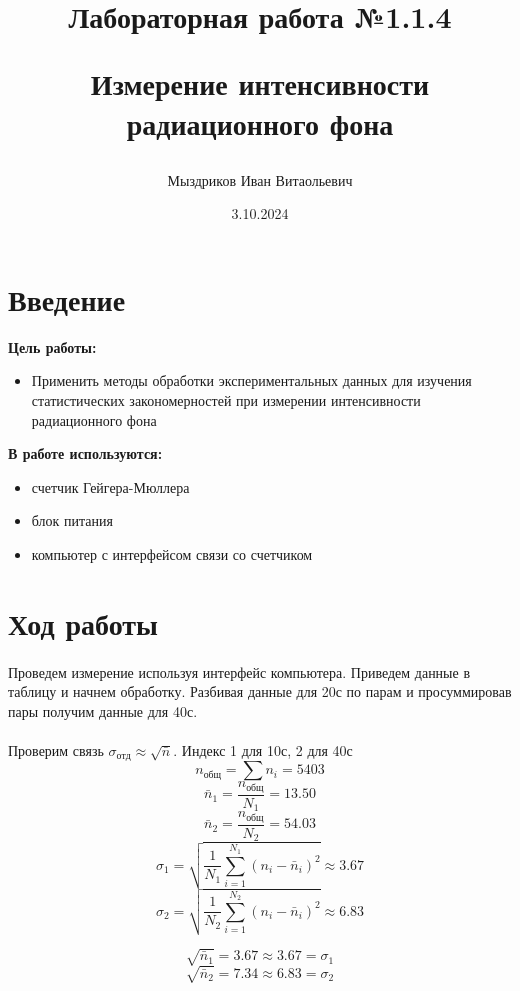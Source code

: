 \documentclass[a4paper, 12pt]{article}
\title{\begin{center}Лабораторная работа №1.1.4\end{center}
Измерение интенсивности радиационного фона}
\author{Мыздриков Иван Витаольевич}
\date{3.10.2024}
\begin{document}
    \maketitle
    \newpage

    \section{Введение}
    \textbf{Цель работы:}
    \begin{itemize}
        \item Применить методы обработки экспериментальных данных для изучения статистических закономерностей при измерении интенсивности радиационного фона
    \end{itemize}

    \vspace{1cm}

    \textbf{В работе используются: }
    \begin{itemize}
        \item счетчик Гейгера-Мюллера
        \item блок питания
        \item компьютер с интерфейсом связи со счетчиком

    \end{itemize}

    \section{Ход работы}
    \paragraph{}
    Проведем измерение используя интерфейс компьютера. Приведем данные в таблицу и начнем  обработку. Разбивая данные для 20с по парам и просуммировав пары получим данные для 40с.
    \paragraph{}
    Проверим связь $\sigma_{отд}\approx \sqrt{\bar{n}}$. Индекс 1 для 10с, 2 для 40с
    \[n_{общ} = \sum n_i = 5403\]
    \[\bar{n}_1 = \frac{n_{общ}}{N_1} = 13.50\]
    \[\bar{n}_2 = \frac{n_{общ}}{N_2} = 54.03\]
    \[\sigma_{1}=\sqrt{\frac{1}{N_1} \sum_{i=1}^{N_1} (n_i - \bar{n}_i)^2} \approx 3.67\]
    \[\sigma_{2}=\sqrt{\frac{1}{N_2} \sum_{i=1}^{N_2} (n_i - \bar{n}_i)^2} \approx 6.83\]
    \newpage

    \[\sqrt{\bar{n}_1} =3.67 \approx 3.67= \sigma_1\]
    \[\sqrt{\bar{n}_2} =7.34 \approx 6.83 = \sigma_2\]
\end{document}
